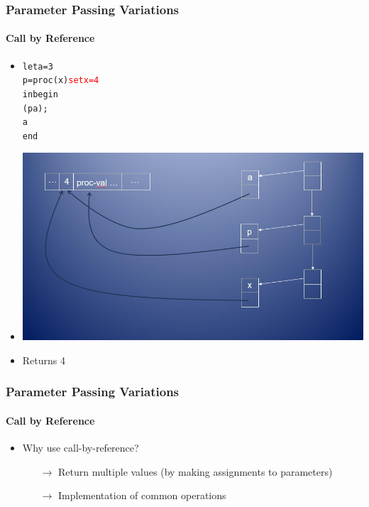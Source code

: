 \documentclass{beamer}
\newcommand{\arrow}{\(\rightarrow\)}
\begin{document}
\begin{frame}[fragile]
\frametitle{Parameter Passing Variations}
\framesubtitle{Call by Reference}
\begin{scriptsize}
\begin{itemize}
\item<1->
\begin{alltt}
let a = 3
	p = proc (x) \textcolor{red}{set x = 4}
in begin
    (p a);
    a
   end
\end{alltt}

\item<1->
\begin{center}
  \includegraphics[scale=0.5]{cbr4.jpg}
\end{center}

\item<1-> Returns 4

\end{itemize}
\end{scriptsize}
\end{frame}

\begin{frame}[fragile]
\frametitle{Parameter Passing Variations}
\framesubtitle{Call by Reference}
\begin{scriptsize}
\begin{itemize}
\item<1-> Why use call-by-reference?
\begin{itemize}
\item[\arrow] Return multiple values (by making assignments to parameters)

\item[\arrow] Implementation of common operations
\end{itemize}


\end{itemize}
\end{scriptsize}
\end{frame}
\end{document}
